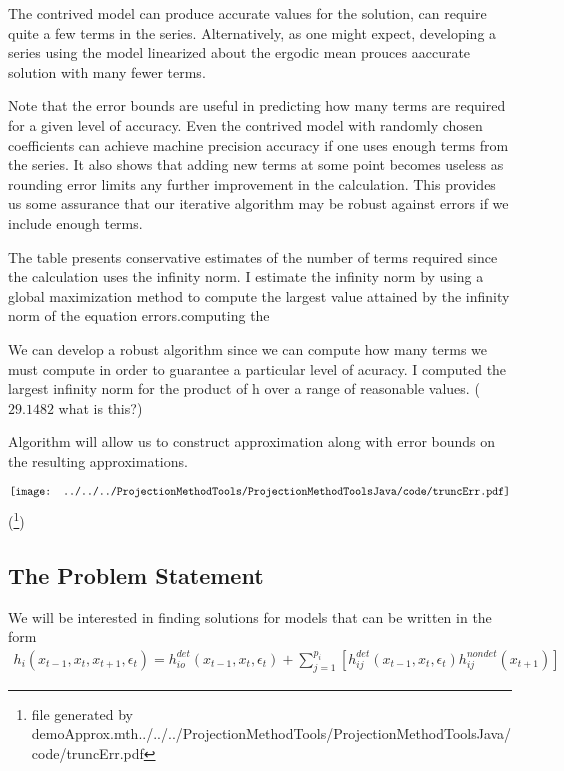\documentclass[12pt]{article}
\begin{document}
The contrived model can produce accurate values for the solution, can require quite a few terms in the series.  Alternatively, as one might expect, developing 
a series using the model linearized about the ergodic mean prouces aaccurate
solution with many fewer terms.  

Note that the error bounds are useful in predicting how many terms are required for a given level of accuracy. Even the contrived model with randomly chosen
coefficients can achieve machine precision accuracy if one uses enough
terms from the series.  It also shows that adding new terms at some point becomes useless as rounding error limits any further improvement in the calculation.
This provides us some assurance that our iterative algorithm may be robust 
against errors if we include enough terms.

The table presents conservative estimates of the number of terms required
since the calculation uses the infinity norm.  I estimate the infinity
norm by using a global maximization method to compute the largest value
attained by the infinity norm of the equation errors.computing the

We can develop a robust algorithm since we can compute how many terms
we must compute in order to guarantee a particular level of acuracy.
I computed the largest infinity norm for the product of h over a range of
reasonable values.  ($29.1482$ what is this?)

Algorithm will allow us to construct approximation along with error bounds on the resulting approximations.


\begin{gather*}
\vcenter{\hbox{\texttt{[image: ../../../ProjectionMethodTools/ProjectionMethodToolsJava/code/truncErr.pdf]}}}
\end{gather*}(\footnote{file generated by demoApprox.mth{../../../ProjectionMethodTools/ProjectionMethodToolsJava/code/truncErr.pdf}})
  \subsection{The Problem Statement}

We will be interested in finding solutions for models that can be written in  the form
\begin{gather*}
  h_i(x_{t-1},x_{t},x_{t+1},\epsilon_t)=h^{det}_{io}(x_{t-1},x_{t},\epsilon_t)+\sum_{j=1}^{p_i} [h^{det}_{ij}(x_{t-1},x_{t},\epsilon_t)h^{nondet}_{ij}(x_{t+1})]
\end{gather*}
\end{document}
